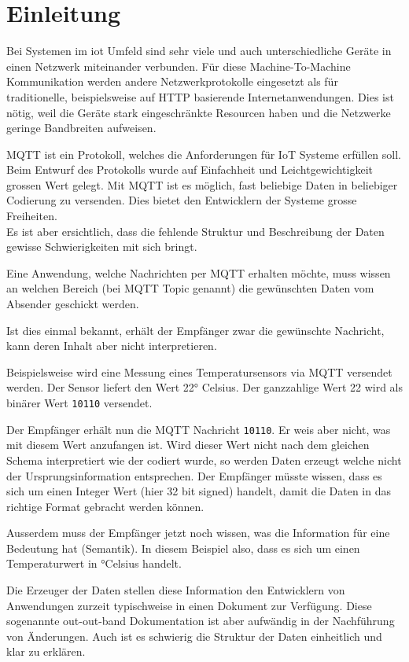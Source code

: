 \chapter{Einleitung}
\label{chap:einleitung}

Bei Systemen im \acrfull{iot} Umfeld sind sehr viele und auch unterschiedliche Geräte in einen Netzwerk miteinander verbunden. 
Für diese Machine-To-Machine Kommunikation werden andere Netzwerkprotokolle eingesetzt als für traditionelle, beispielsweise auf HTTP basierende Internetanwendungen. Dies ist nötig, weil die Geräte stark eingeschränkte Resourcen haben und die Netzwerke geringe Bandbreiten aufweisen.

MQTT ist ein Protokoll, welches die Anforderungen für IoT Systeme erfüllen soll. Beim Entwurf des Protokolls wurde auf Einfachheit und Leichtgewichtigkeit grossen Wert gelegt. Mit MQTT ist es möglich, fast beliebige Daten in beliebiger Codierung zu versenden. Dies bietet den Entwicklern der Systeme grosse Freiheiten. \\
Es ist aber ersichtlich, dass die fehlende Struktur und Beschreibung der Daten gewisse Schwierigkeiten mit sich bringt. 

Eine Anwendung, welche Nachrichten per MQTT erhalten möchte, muss wissen an welchen Bereich (bei MQTT Topic genannt) die gewünschten Daten vom Absender geschickt werden.

Ist dies einmal bekannt, erhält der Empfänger zwar die gewünschte Nachricht, kann deren Inhalt aber nicht interpretieren.

Beispielsweise wird eine Messung eines Temperatursensors via MQTT versendet werden. Der Sensor liefert den Wert 22° Celsius.
Der ganzzahlige Wert 22 wird als binärer Wert \texttt{10110} versendet.

Der Empfänger erhält nun die MQTT Nachricht \texttt{10110}. Er weis aber nicht, was mit diesem Wert anzufangen ist. Wird dieser Wert nicht nach dem gleichen Schema interpretiert wie der codiert wurde, so werden Daten erzeugt welche nicht der Ursprungsinformation entsprechen.
Der Empfänger müsste wissen, dass es sich um einen Integer Wert (hier 32 bit signed) handelt, damit die Daten in das richtige Format gebracht werden können.

Ausserdem muss der Empfänger jetzt noch wissen, was die Information für eine Bedeutung hat (Semantik). In diesem Beispiel also, dass es sich um einen Temperaturwert in °Celsius handelt.

Die Erzeuger der Daten stellen diese Information den Entwicklern von Anwendungen zurzeit typischweise in einen Dokument zur Verfügung. Diese sogenannte out-out-band Dokumentation ist aber aufwändig in der Nachführung von Änderungen. Auch ist es schwierig die Struktur der Daten einheitlich und klar zu erklären.